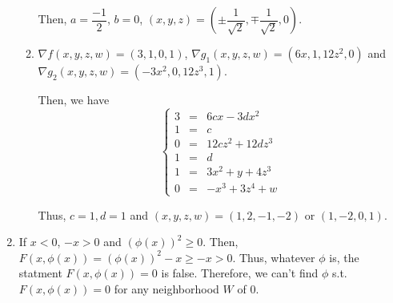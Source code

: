\documentclass[12pt]{article}
\begin{document}
\begin{enumerate}
\begin{enumerate}
        Then, $a = \dfrac{-1}{2}$, $b = 0$, $(x, y, z) = (\pm \dfrac{1}{\sqrt{2}}, \mp \dfrac{1}{\sqrt{2}}, 0)$.
        
        \item $\nabla f(x, y, z, w) = (3, 1, 0, 1)$, $\nabla g_1(x, y, z, w) = (6x, 1, 12z^2, 0)$ and $\nabla g_2(x, y, z, w) = (-3x^2, 0, 12z^3, 1)$.
        
        Then, we have $$\left\{\begin{matrix}
            3 &=& 6cx -3dx^2\\
            1 &=& c\\
            0 &=& 12cz^2 + 12dz^3\\
            1 &=& d\\
            1 &=& 3x^2 + y + 4z^3\\
            0 &=& -x^3 + 3z^4 + w
        \end{matrix}
        \right.
        $$

        Thus, $c = 1, d = 1$ and $(x, y, z, w) = (1, 2, -1, -2)$ or $(1, -2, 0, 1)$.
    \end{enumerate}
    
    \item If $x < 0$, $-x > 0$ and $(\phi(x))^2 \geq 0$. Then, $F(x, \phi(x)) = (\phi(x))^2 - x \geq -x > 0$.
    Thus, whatever $\phi$ is, the statment $F(x, \phi(x)) = 0$ is false.
    Therefore, we can't find $\phi$ s.t. $F(x, \phi(x)) = 0$ for any neighborhood $W$ of $0$.
\end{enumerate}
\end{document}
